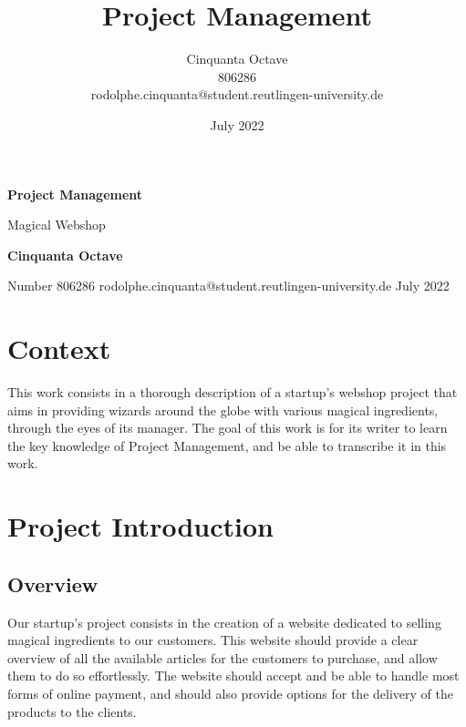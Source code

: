 \documentclass{article}
\title{Project Management}
\author{Cinquanta Octave \\ 806286 \\ rodolphe.cinquanta@student.reutlingen-university.de}
\date{July 2022}
\begin{document}
\begin{titlepage}
    \begin{center}
        \vspace*{1cm}
            
        \Huge
        \textbf{Project Management}
            
        \vspace{0.5cm}
        \LARGE
        Magical Webshop
            
        \vspace{1.5cm}
            
        \textbf{Cinquanta Octave}
            
        \vfill
            
        \vspace{0.8cm}
            
        \Large
        Number 806286
        \vspace{0.8cm}
        rodolphe.cinquanta@student.reutlingen-university.de
        July 2022
            
    \end{center}
\end{titlepage}

\tableofcontents

\newpage
\section{Context}

This work consists in a thorough description of a startup's webshop project that aims in providing wizards around the globe with various magical ingredients, through the eyes of its manager. The goal of this work is for its writer to learn the key knowledge of Project Management, and be able to transcribe it in this work.

\section{Project Introduction}
\subsection{Overview}

Our startup's project consists in the creation of a website dedicated to selling magical ingredients to our customers. This website should provide a clear overview of all the available articles for the customers to purchase, and allow them to do so effortlessly. The website should accept and be able to handle most forms of online payment, and should also provide options for the delivery of the products to the clients. 
\end{document}
